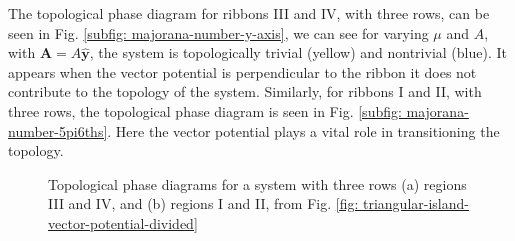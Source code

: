 \documentclass[aps,prb,showpacs,amsmath,twocolumn,amssymb,superscriptaddress]{revtex4-2}
\let\oldhat\hat
\renewcommand{\hat}[1]{\oldhat{\mathbf{#1}}}
\renewcommand{\vec}[1]{\mathbf{#1}}
\begin{document}
The topological phase diagram for ribbons III and IV, with three rows, can be seen in Fig. \ref{subfig: majorana-number-y-axis}, we can see for varying $\mu$ and $A$, with $\vec{A} = A\hat{y}$, the system is topologically trivial (yellow) and nontrivial (blue).
It appears when the vector potential is perpendicular to the ribbon it does not contribute to the topology of the system.
Similarly, for ribbons I and II, with three rows, the topological phase diagram is seen in Fig. \ref{subfig: majorana-number-5pi6ths}.
Here the vector potential plays a vital role in transitioning the topology.

\begin{figure}[]
  \hfill
  \hfill
  \caption{Topological phase diagrams for a system with three rows (a) regions III and IV, and (b) regions I and II, from Fig. \ref{fig: triangular-island-vector-potential-divided}}
  \label{fig: majorana-number}
\end{figure}
\end{document}
